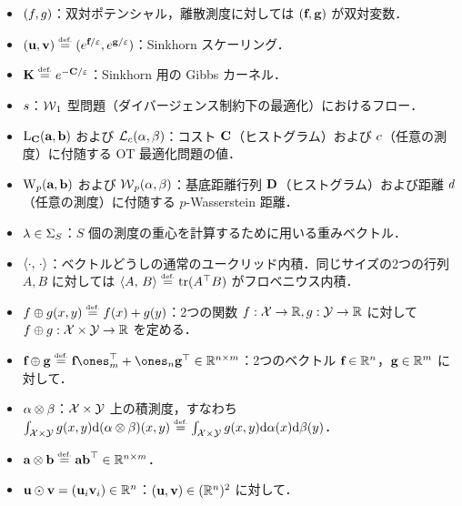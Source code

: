 \begin{itemize}
	\item $(\f,\g)$：双対ポテンシャル，離散測度に対しては $(\fD,\gD)$ が双対変数．
	\item $(\uD,\vD) \eqdef (e^{\fD/\varepsilon},e^{\gD/\varepsilon})$：Sinkhorn スケーリング．
	\item $\K \eqdef e^{-\C/\varepsilon}$：Sinkhorn 用の Gibbs カーネル．
	\item $\flow$：$\Wass_1$ 型問題（ダイバージェンス制約下の最適化）におけるフロー．
	\item $\MKD_\C(\a,\b)$ および $\MK_\c(\al,\be)$：コスト $\C$（ヒストグラム）および $\c$（任意の測度）に付随する OT 最適化問題の値．
	\item $\WassD_p(\a,\b)$ および $\Wass_p(\al,\be)$：基底距離行列 $\distD$（ヒストグラム）および距離 $\dist$（任意の測度）に付随する $p$-Wasserstein 距離．
	\item $\lambda\in\simplex_S$：$S$ 個の測度の重心を計算するために用いる重みベクトル．
	\item $\dotp{\cdot}{\cdot}$：ベクトルどうしの通常のユークリッド内積．同じサイズの2つの行列 $A,B$ に対しては $\dotp{A}{B} \eqdef \trace(A^\top B)$ がフロベニウス内積．
	\item $\f\oplus \g(x,y) \eqdef f(x)+g(y)$：2つの関数 $\f : \X \rightarrow \RR, \g : \Y \rightarrow \RR$ に対して $\f \oplus \g : \X\times \Y \rightarrow \RR$ を定める．
	\item $\fD \oplus \gD \eqdef \fD \ones_m^\top + \ones_n \gD^\top \in \RR^{n\times m}$：2つのベクトル $\fD\in\RR^n$，$\gD\in\RR^m$ に対して．
	\item $\al \otimes \be$：$\X \times \Y$ 上の積測度，すなわち $\int_{\X \times \Y} g(x,y) \d(\al\otimes\be)(x,y) \eqdef \int_{\X \times \Y} g(x,y) \d\al(x) \d\be(y)$．
	\item $\a \otimes \b \eqdef \a \b^\top \in \RR^{n \times m}$．
	\item $\uD \odot \vD = (\uD_i \vD_i) \in \RR^n$：$(\uD, \vD) \in (\RR^n)^2$ に対して．
\end{itemize}
